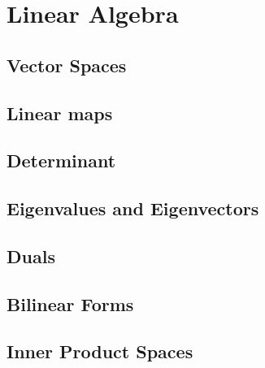 \documentclass[main.tex]{subfiles}
\begin{document}
	\chapter{Linear Algebra}
		\section{Vector Spaces}
		
		\section{Linear maps}
		
		\section{Determinant}
		
		\section{Eigenvalues and Eigenvectors}
		
		\section{Duals}
		
		\section{Bilinear Forms}
		
		\section{Inner Product Spaces}
		
\end{document}
